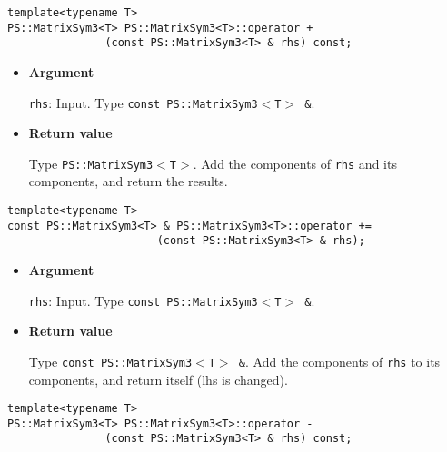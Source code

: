\begin{screen}
\begin{verbatim}
template<typename T>
PS::MatrixSym3<T> PS::MatrixSym3<T>::operator + 
               (const PS::MatrixSym3<T> & rhs) const;
\end{verbatim}
\end{screen}

\begin{itemize}

\item{{\bf Argument}}

\texttt{rhs}: Input. Type \texttt{const PS::MatrixSym3$<$T$>$ \&}.

\item{{\bf Return value}}

Type \texttt{PS::MatrixSym3$<$T$>$}. Add the components of \texttt{rhs} and its
components, and return the results.

\end{itemize}

\begin{screen}
\begin{verbatim}
template<typename T>
const PS::MatrixSym3<T> & PS::MatrixSym3<T>::operator += 
                       (const PS::MatrixSym3<T> & rhs);
\end{verbatim}
\end{screen}

\begin{itemize}

\item{{\bf Argument}}

\texttt{rhs}: Input. Type \texttt{const PS::MatrixSym3$<$T$>$ \&}.

\item{{\bf Return value}}

Type \texttt{const PS::MatrixSym3$<$T$>$ \&}. Add the components of \texttt{rhs} to its
components, and return itself (lhs is changed).

\end{itemize}

\begin{screen}
\begin{verbatim}
template<typename T>
PS::MatrixSym3<T> PS::MatrixSym3<T>::operator - 
               (const PS::MatrixSym3<T> & rhs) const;
\end{verbatim}
\end{screen}

